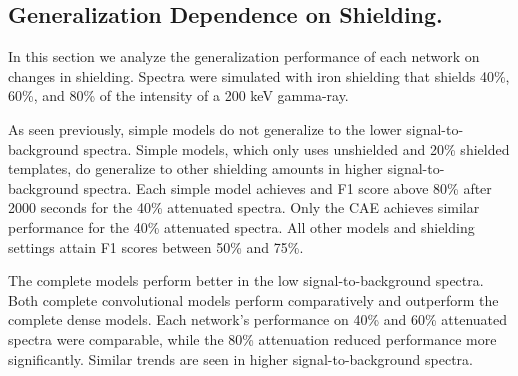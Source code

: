 \subsection{Generalization Dependence on Shielding.}

In this section we analyze the generalization performance of each network on changes in shielding. Spectra were simulated with iron shielding that shields 40\%, 60\%, and 80\% of the intensity of a 200 keV gamma-ray.

As seen previously, simple models do not generalize to the lower signal-to-background spectra. Simple models, which only uses unshielded and 20\% shielded templates, do generalize to other shielding amounts in higher signal-to-background spectra. Each simple model achieves and F1 score above 80\% after 2000 seconds for the 40\% attenuated spectra. Only the CAE achieves similar performance for the 40\% attenuated spectra. All other models and shielding settings attain F1 scores between 50\% and 75\%.

The complete models perform better in the low signal-to-background spectra. Both complete convolutional models perform comparatively and outperform the complete dense models. Each network's performance on 40\% and 60\% attenuated spectra were comparable, while the 80\% attenuation reduced performance more significantly. Similar trends are seen in higher signal-to-background spectra. 


